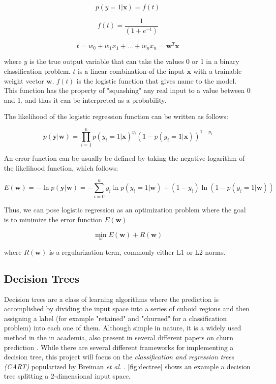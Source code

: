 \documentclass{kththesis}
\begin{document}
\begin{equation}
p(y = 1|\mathbf{x}) = f(t)
\end{equation}

\begin{equation}
f(t) = \frac{1}{(1+e^{-t})}
\end{equation}

\begin{equation}
t = w_0 + w_1x_1 + ... + w_nx_n = \mathbf{w}^T\mathbf{x}
\end{equation}

where $y$ is the true output variable that can take the values 0 or 1 in a binary classification problem. $t$ is a linear combination of the input $\bm{x}$ with a trainable weight vector $\mathbf{w}$. $f(t)$ is the logistic function that gives name to the model. This function has the property of "squashing" any real input to a value between 0 and 1, and thus it can be interpreted as a probability. 

The likelihood of the logistic regression function can be written as follows:

\begin{equation}
p(\mathbf{y}|\mathbf{w}) = \prod_{i=1}^{n}  p(y_i=1|\mathbf{x})^{y_i} (1-p(y_i=1|\mathbf{x}))^{1-y_i}
\end{equation}

An error function can be usually be defined by taking the negative logarithm of the likelihood function, which follows:

\begin{equation}
E(\mathbf{w}) = -\ln p(\mathbf{y}|\mathbf{w}) = - \sum_{i=0}^{n} y_i \ln p(y_i=1|\mathbf{w}) + (1-y_i) \ln (1 - p(y_i=1|\mathbf{w}))
\end{equation}

Thus, we can pose logistic regression as an optimization problem where the goal is to minimize the error function $E(\mathbf{w})$ 

\begin{equation}
\displaystyle{\min_w} E(\mathbf{w}) + R(\mathbf{w})
\end{equation}

where $R(\mathbf{w})$ is a regularization term, commonly either L1 or L2 norms.

\subsection{Decision Trees}
Decision trees are a class of learning algorithms where the prediction is accomplished by dividing the input space into a series of cuboid regions and then assigning a label (for example "retained" and "churned" for a classification problem) into each one of them. Although simple in nature, it is a widely used method in the in academia, also present in several different papers on churn prediction \citep{Pudipeddi2014}\citep{Hassouna2015} \citep{Ballings2012} \citep{Khan2015}. While there are several different frameworks for implementing a decision tree, this project will focus on the \emph{classification and regression trees (CART)} popularized by Breiman \emph{et al.} \citep{breiman1984classification}. \autoref{fig:dectree} shows an example a decision tree splitting a 2-dimensional input space.  
\end{document}
